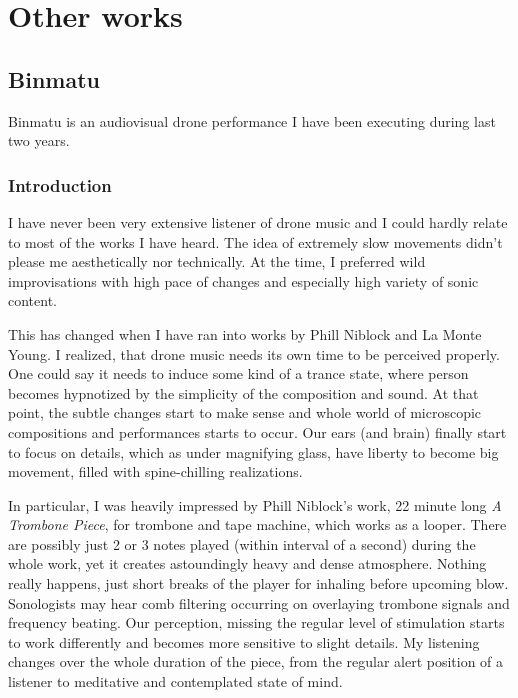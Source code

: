 \documentclass[12pt,a4paper,oneside]{report}
\begin{document}
\chapter{Other works} 
\section{Binmatu} Binmatu is an audiovisual drone performance I have been executing during last two years.

\subsection{Introduction} I have never been very extensive listener of drone music and I could hardly relate to most of the works I have heard. The idea of extremely slow movements didn't please me aesthetically nor technically. At the time, I preferred wild improvisations with high pace of changes and especially high variety of sonic content.

This has changed when I have ran into works by Phill Niblock and La Monte Young. I realized, that drone music needs its own time to be perceived properly. One could say it needs to induce some kind of a trance state, where person becomes hypnotized by the simplicity of the composition and sound. At that point, the subtle changes start to make sense and whole world of microscopic compositions and performances starts to occur. Our ears (and brain) finally start to focus on details, which as under magnifying glass, have liberty to become big movement, filled with spine-chilling realizations.

In particular, I was heavily impressed by Phill Niblock's work, 22 minute long \emph{A Trombone Piece}, for trombone and tape machine, which works as a looper. There are possibly just 2 or 3 notes played (within interval of a second) during the whole work, yet it creates astoundingly heavy and dense atmosphere. Nothing really happens, just short breaks of the player for inhaling before upcoming blow. Sonologists may hear comb filtering occurring on overlaying trombone signals and frequency beating. Our perception, missing the regular level of stimulation starts to work differently and becomes more sensitive to slight details. My listening changes over the whole duration of the piece, from the regular alert position of a listener to meditative and contemplated state of mind. 
\end{document}
